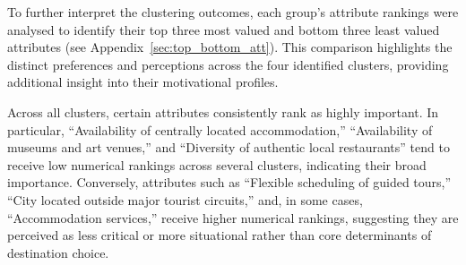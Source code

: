 \documentclass[a4paper, 12pt, twoside]{report}  %
\begin{document}
\indent To further interpret the clustering outcomes, each group’s attribute rankings were analysed to identify their top three most valued and bottom three least valued attributes (see Appendix~\ref{sec:top_bottom_att}). This comparison highlights the distinct preferences and perceptions across the four identified clusters, providing additional insight into their motivational profiles.

\indent Across all clusters, certain attributes consistently rank as highly important. In particular, “Availability of centrally located accommodation,” “Availability of museums and art venues,” and “Diversity of authentic local restaurants” tend to receive low numerical rankings across several clusters, indicating their broad importance. Conversely, attributes such as “Flexible scheduling of guided tours,” “City located outside major tourist circuits,” and, in some cases, “Accommodation services,” receive higher numerical rankings, suggesting they are perceived as less critical or more situational rather than core determinants of destination choice.
\end{document}
